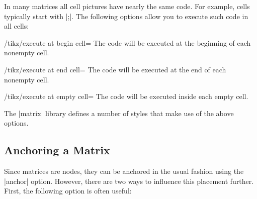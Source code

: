 In many matrices all cell pictures have nearly the same code. For example,
cells typically start with |;|. The following options allow
you to execute such code in all cells:

\begin{key}{/tikz/execute at begin cell=}
    The code will be executed at the beginning of each nonempty cell.
\end{key}
%
\begin{key}{/tikz/execute at end cell=}
    The code will be executed at the end of each nonempty cell.
\end{key}
%
\begin{key}{/tikz/execute at empty cell=}
    The code will be executed inside each empty cell.
\end{key}
%
\begin{codeexample}[]
\end{codeexample}
%
\begin{codeexample}[]
\end{codeexample}

The |matrix| library defines a number of styles that make use of the above
options.


\subsection{Anchoring a Matrix}

Since matrices are nodes, they can be anchored in the usual fashion using the
|anchor| option. However, there are two ways to influence this placement
further. First, the following option is often useful:

